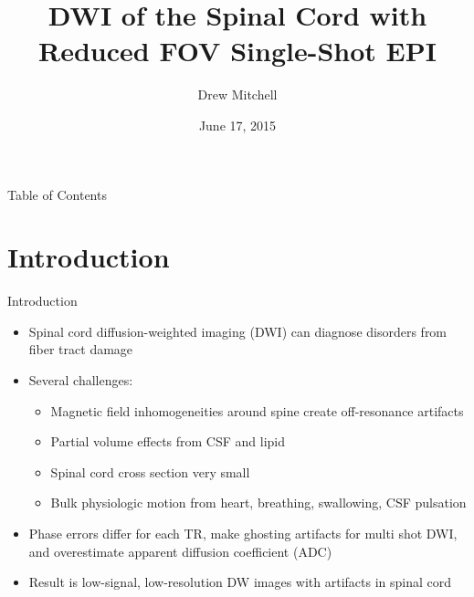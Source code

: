 \documentclass{beamer}
\title[Spinal Cord DWI with Reduced FOV ss-EPI]{DWI of the Spinal Cord with Reduced FOV Single-Shot EPI}
\author{Drew Mitchell}
\institute{MD Anderson Cancer Center}
\date{June 17, 2015}
\begin{document}
 
{
\frame{\titlepage}
\begin{frame}{Table of Contents}
\tableofcontents
\end{frame}
}

\section{Introduction}

\begin{frame}{Introduction}
\begin{itemize}
	\item Spinal cord diffusion-weighted imaging (DWI) can diagnose disorders from fiber tract damage
	\item Several challenges:
	\begin{itemize}
		\item Magnetic field inhomogeneities around spine create off-resonance artifacts
		\item Partial volume effects from CSF and lipid
		\item Spinal cord cross section very small
		\item Bulk physiologic motion from heart, breathing, swallowing, CSF pulsation
	\end{itemize}
	\item Phase errors differ for each TR, make ghosting artifacts for multi shot DWI, and overestimate apparent diffusion coefficient (ADC)
	\item Result is low-signal, low-resolution DW images with artifacts in spinal cord
\end{itemize}
\end{frame}
\end{document}
